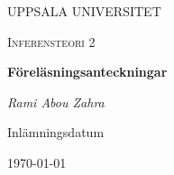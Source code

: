 \begin{titlepage}

  \centering
	{\scshape\LARGE UPPSALA UNIVERSITET\par}
	\vspace{1cm}
  {\scshape\Large {Inferensteori 2} \par}
	\vspace{1.5cm}
  {\huge\bfseries {Föreläsningsanteckningar} \par}
	\vspace{2cm}
	{\Large\itshape Rami Abou Zahra \par}
	\vfill
  \vfill


  {\large Inlämningsdatum}\par
  {\today}

\end{titlepage}
